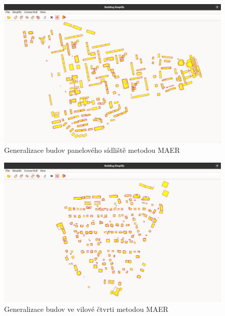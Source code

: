 \begin{figure}[H]
    \centering
    \includegraphics[width=\textwidth]{images/Ukazaka_block.JPG}
    \caption{Generalizace budov panelového sídliště metodou MAER}
\end{figure}

\begin{figure}[H]
    \centering
    \includegraphics[width=\textwidth]{images/Ukazaka_villa_district.JPG}
    \caption{Generalizace budov ve vilové čtvrti metodou MAER}
\end{figure}
